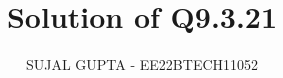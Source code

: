 \documentclass[journal,12pt,twocolumn]{IEEEtran}
\theoremstyle{remark}
\begin{document}
%




\vspace{3cm}

\title{
Solution of Q9.3.21
}
\author{ SUJAL GUPTA - EE22BTECH11052
}	


%
%
%

% 
%



% 
\end{document}
